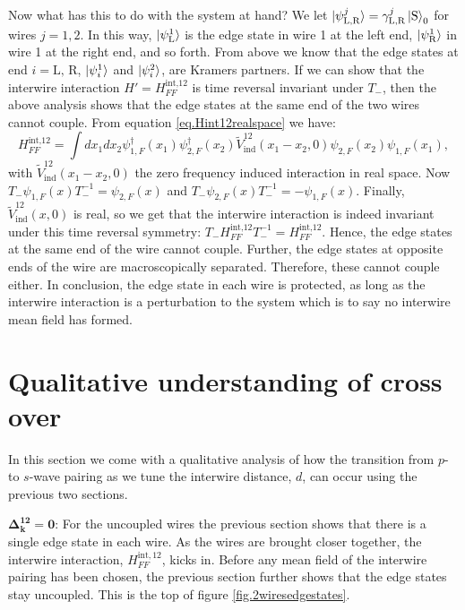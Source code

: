 Now what has this to do with the system at hand? We let $\ket{ \psi^{j}_{\text{L,R}} } = \gamma^{j}_{\text{L,R}}\ket{\text{S}}_0$ for wires $j = 1, 2$. In this way, $\ket{\psi^{1}_{\text{L}}}$ is the edge state in wire 1 at the left end, $\ket{\psi^{1}_{\text{R}}}$ in wire 1 at the right end, and so forth. From above we know that the edge states at end $i = \text{L, R}$, $\ket{\psi^1_{i}}$ and $\ket{\psi^2_{i}}$, are Kramers partners. If we can show that the interwire interaction $H' = H^\text{int,12}_{FF}$ is time reversal invariant under $T_-$, then the above analysis shows that the edge states at the same end of the two wires cannot couple. From equation \eqref{eq.Hint12realspace} we have:
\begin{equation}
H^\text{int,12}_{FF} = \int dx_1 dx_2 \psi^\dagger_{1,F}(x_1)\psi^\dagger_{2,F}(x_2) \tilde{V}_{\text{ind}}^{12}(x_1-x_2,0) \psi_{2,F}(x_2)\psi_{1,F}(x_1),
\end{equation}
with $\tilde{V}_{\text{ind}}^{12}(x_1-x_2,0)$ the zero frequency induced interaction in real space. Now $T_-\psi_{1,F}(x)T^{-1}_- = \psi_{2,F}(x)$ and $T_-\psi_{2,F}(x)T^{-1}_- = -\psi_{1,F}(x)$. Finally, $\tilde{V}_{\text{ind}}^{12}(x, 0)$ is real, so we get that the interwire interaction is indeed invariant under this time reversal symmetry: $T_-H^\text{int,12}_{FF}T_-^{-1} = H^\text{int,12}_{FF}$. Hence, the edge states at the same end of the wire cannot couple. Further, the edge states at opposite ends of the wire are macroscopically separated. Therefore, these cannot couple either. In conclusion, the edge state in each wire is protected, as long as the interwire interaction is a perturbation to the system which is to say no interwire mean field has formed.  

\section{Qualitative understanding of cross over}
\label{sec.2wirestransitionqualitative}
In this section we come with a qualitative analysis of how the transition from $p$- to $s$-wave pairing as we tune the interwire distance, $d$, can occur using the previous two sections. 

$\mathbf{\Delta^{12}_k = 0}$: For the uncoupled wires the previous section shows that there is a single edge state in each wire. As the wires are brought closer together, the interwire interaction, $H^{\text{int},12}_{FF}$, kicks in. Before any mean field of the interwire pairing has been chosen, the previous section further shows that the edge states stay uncoupled. This is the top of figure \ref{fig.2wiresedgestates}. 

